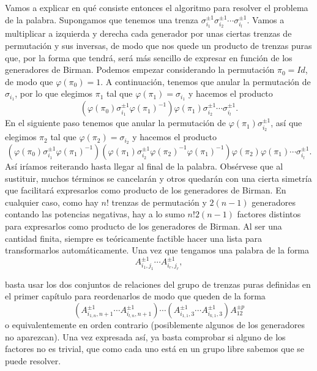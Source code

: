 \documentclass[TFG.tex]{subfiles}
\begin{document}
Vamos a explicar en qué consiste entonces el algoritmo para resolver el problema de la palabra. Supongamos que tenemos una trenza $\sigma_{i_1}^{\pm 1}\sigma_{i_2}^{\pm 1}\cdots\sigma_{i_l}^{\pm 1}$. Vamos a multiplicar a izquierda y derecha cada generador por unas ciertas trenzas de permutación y sus inversas, de modo que nos quede un producto de trenzas puras que, por la forma que tendrá, será más sencillo de expresar en función de los generadores de Birman. Podemos empezar considerando la permutación $\pi_0=Id$, de modo que $\varphi(\pi_0)=1$. A continuación, tenemos que anular la permutación de $\sigma_{i_1}$, por lo que elegimos $\pi_1$ tal que $\varphi(\pi_1)=\sigma_{i_1}$ y hacemos el producto
\[
(\varphi(\pi_0)\sigma_{i_1}^{\pm 1}\varphi(\pi_1)^{-1})\varphi(\pi_1)\sigma_{i_2}^{\pm 1}\cdots\sigma_{i_l}^{\pm 1}.
\]
En el siguiente paso tenemos que anular la permutación de $\varphi(\pi_1)\sigma_{i_2}^{\pm 1}$, así que elegimos $\pi_2$ tal que $\varphi(\pi_2)=\sigma_{i_2}$ y hacemos el producto
\[
(\varphi(\pi_0)\sigma_{i_1}^{\pm 1}\varphi(\pi_1)^{-1})(\varphi(\pi_1)\sigma_{i_2}^{\pm 1}\varphi(\pi_2)^{-1}\varphi(\pi_1)^{-1})\varphi(\pi_2)\varphi(\pi_1)\cdots\sigma_{i_l}^{\pm 1}.
\]
Así iríamos reiterando hasta llegar al final de la palabra. Obsérvese que al sustituir, muchos términos se cancelarán y otros quedarán con una cierta simetría que facilitará expresarlos como producto de los generadores de Birman. En cualquier caso, como hay $n!$ trenzas de permutación y $2(n-1)$ generadores contando las potencias negativas, hay a lo sumo $n!2(n-1)$ factores distintos para expresarlos como producto de los generadores de Birman. Al ser una cantidad finita, siempre es teóricamente factible hacer una lista para transformarlos automáticamente. Una vez que tengamos una palabra de la forma
\[
A_{i_1,j_1}^{\pm 1}\cdots A_{i_r,j_r}^{\pm 1},
\]

basta usar los dos conjuntos de relaciones del grupo de trenzas puras definidas en el primer capítulo para reordenarlos de modo que queden de la forma
\[
(A_{i_{1,n},n+1}^{\pm 1}\cdots A_{i_{l,n},n+1}^{\pm 1})\cdots(A_{i_{1,1},3}^{\pm 1}\cdots A_{i_{k,1},3}^{\pm 1}) A_{12}^{\pm p}
\]
o equivalentemente en orden contrario (posiblemente algunos de los generadores no aparezcan). Una vez expresada así, ya basta comprobar si alguno de los factores no es trivial, que como cada uno está en un grupo libre sabemos que se puede resolver.
\end{document}
